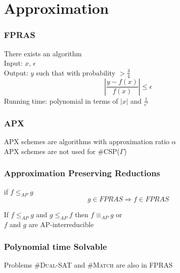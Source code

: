\documentclass[a4paper,handout]{beamer}
\newcommand{\pname}[1]{\textsc{#1}}
\newcommand{\ccsp}{\#CSP}
\newcommand{\aple}{\le_{AP}}
\newcommand{\apeq}{\equiv_{AP}}
\newcommand{\oneoepsp}{\frac{1}{\epsilon'}}
\newcommand{\eps}{\epsilon}
\theoremstyle{definition}
\begin{document}
\section{Approximation}

\begin{frame}
\frametitle{FPRAS}
\begin{definition} 
There exists an algorithm \\
Input: \(x\), \(\eps\) \\
Output: \(y\) such that with probability \( > \frac{3}{4}\)
\[\left|\frac{y-f(x)}{f(x)}\right| \le \eps\]
Running time: polynomial in terms of \(|x|\) and \(\oneoepsp\)
\end{definition}
\end{frame}

\begin{frame}
\frametitle{APX}
APX schemes are algorithms with approximation ratio \(\alpha\) \\

\pause
APX schemes are not used for \ccsp(\(\Gamma\))
\end{frame}

\begin{frame}
\frametitle{Approximation Preserving Reductions}
\begin{definition}[AP-reduction]
if \(f \aple g\) \\
\[g \in FPRAS \Rightarrow f \in FPRAS\]
\end{definition}

\pause
If \(f \aple g\) and \(g \aple f\) then \(f \apeq g\) or \\
\(f\) and \(g\) are \textcolor{mygreen}{AP-interreducible}
\end{frame}

\begin{frame}
\frametitle{Polynomial time Solvable}
\begin{center}
\end{center}

\pause
Problems \pname{\#Dual-SAT} and \pname{\#Match} are also in FPRAS
\end{frame}
\end{document}
